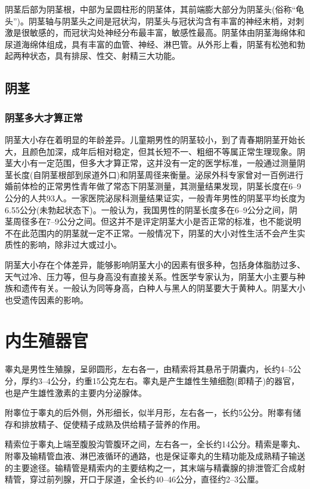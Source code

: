 \documentclass[12pt,UTF8]{ctexbook}
\begin{document}
阴茎后部为阴茎根，中部为呈圆柱形的阴茎体，其前端膨大部分为阴茎头(俗称“龟头”)。阴茎轴与阴茎头之间是冠状沟，阴茎头与冠状沟含有丰富的神经末梢，对刺激是很敏感的，而冠状沟处神经分布最丰富，敏感性最高。阴茎体由阴茎海绵体和尿道海绵体组成，具有丰富的血管、神经、淋巴管。从外形上看，阴茎有松弛和勃起两种状态，具有排尿、性交、射精三大功能。

\subsection{阴茎}

\subsubsection{阴茎多大才算正常}

阴茎大小存在着明显的年龄差异。儿童期男性的阴茎较小，到了青春期阴茎开始长大，且颜色加深，成年后相对稳定，但其长短不一、粗细不等属正常生理现象。阴茎大小有一定范围，但多大才算正常，这并没有一定的医学标准，一般通过测量阴茎长度(自阴茎根部到尿道外口)和阴茎周径来衡量。泌尿外科专家曾对一百例进行婚前体检的正常男性青年做了常态下阴茎测量，其测量结果发现，阴茎长度在6--9公分的人共93人。一家医院泌尿科测量结果证实，一般青年男性的阴茎平均长度为6.55公分(未勃起状态下)。一般认为，我国男性的阴茎长度多在6--9公分之间，阴茎周径多在7--9公分之间。但这并不是评定阴茎大小是否正常的标准，也不能说明不在此范围内的阴茎就一定不正常。一般情况下，阴茎的大小对性生活不会产生实质性的影响，除非过大或过小。

阴茎大小存在个体差异，能够影响阴茎大小的因素有很多种，包括身体脂肪过多、天气过冷、压力等，但与身高没有直接关系。性医学专家认为，阴茎大小主要与种族和遗传有关。一般认为同等身高，白种人与黑人的阴茎要大于黄种人。阴茎大小也受遗传因素的影响。

\section{内生殖器官}

睾丸是男性生殖腺，呈卵圆形，左右各一，由精索将其悬吊于阴囊内，长约4--5公分，厚约3--4公分，约重15公克左右。睾丸是产生雄性生殖细胞(即精子)的器官，也是产生雄性激素的主要内分泌腺体。

附睾位于睾丸的后外侧，外形细长，似半月形，左右各一，长约5公分。附睾有储存和排放精子、促使精子成熟及供给精子营养的作用。

精索位于睾丸上端至腹股沟管腹环之间，左右各一，全长约14公分。精索是睾丸、附睾及输精管血液、淋巴液循环的通路，也是保证睾丸的生精功能及成熟精子输送的主要途径。输精管是精索内的主要结构之一，其末端与精囊腺的排泄管汇合成射精管，穿过前列腺，开口于尿道，全长约40--46公分，直径约2--3公厘。
\end{document}
